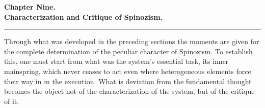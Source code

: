 \documentclass[12pt,a4paper,openany]{book}
\begin{document}
\begin{center}
{\large\textbf{Chapter Nine.}}\\[4pt]
\textbf{Characterization and Critique of Spinozism.}\\[6pt]
\rule{2cm}{0.4pt}
\end{center}
\bigskip

Through what was developed in the preceding sections the
moments are given for the complete determination of the peculiar
character of Spinozism. To establish this, one
must start from what was the system's essential
task, its inner mainspring, which never ceases to act
even where heterogeneous elements force their way in in the execution.
What is deviation from the fundamental thought becomes the object
not of the characterization of the system, but of the critique
of it.
\end{document}
